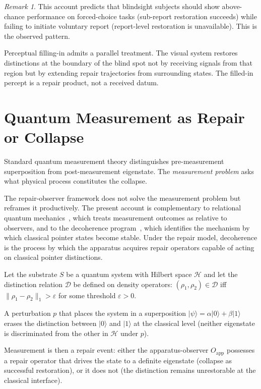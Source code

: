 \documentclass[12pt, oneside]{article}
\theoremstyle{plain}
\theoremstyle{definition}
\theoremstyle{remark}
\newtheorem{remark}[theorem]{Remark}
\theoremstyle{definition}
\newcommand{\Dsub}{\mathcal{D}}
\begin{document}
\begin{remark}
  This account predicts that blindsight subjects should show
  above-chance performance on forced-choice tasks (sub-report
  restoration succeeds) while failing to initiate voluntary report
  (report-level restoration is unavailable).
  This is the observed pattern.
\end{remark}

Perceptual filling-in admits a parallel treatment.
The visual system restores distinctions at the boundary of the blind
spot not by receiving signals from that region but by extending repair
trajectories from surrounding states.
The filled-in percept is a repair product, not a received datum.


\section{Quantum Measurement as Repair or Collapse}
\label{sec:quantum}

Standard quantum measurement theory distinguishes pre-measurement
superposition from post-measurement eigenstate.
The \emph{measurement problem} asks what physical process constitutes
the collapse.

The repair-observer framework does not solve the measurement problem
but reframes it productively.
The present account is complementary to relational quantum
mechanics~\cite{Rovelli1996}, which treats measurement outcomes as
relative to observers, and to the decoherence program~\cite{Zurek2003},
which identifies the mechanism by which classical pointer states
become stable.
Under the repair model, decoherence is the process by which the
apparatus acquires repair operators capable of acting on classical
pointer distinctions.

Let the substrate $S$ be a quantum system with Hilbert space
$\mathcal{H}$ and let the distinction relation $\Dsub$ be defined on
density operators: $(\rho_1, \rho_2) \in \Dsub$ iff
$\|\rho_1 - \rho_2\|_1 > \varepsilon$ for some threshold
$\varepsilon > 0$.

A perturbation $p$ that places the system in a superposition
$|\psi\rangle = \alpha|0\rangle + \beta|1\rangle$
erases the distinction between $|0\rangle$ and $|1\rangle$ at the
classical level (neither eigenstate is discriminated from the other
in $\mathcal{H}$ under $p$).

Measurement is then a repair event: either the apparatus-observer
$O_{\mathrm{app}}$ possesses a repair operator that drives the state
to a definite eigenstate (collapse as successful restoration), or it
does not (the distinction remains unrestorable at the classical
interface).
\end{document}
